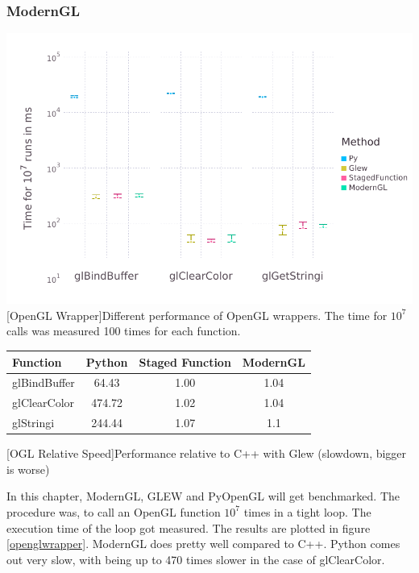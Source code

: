\subsubsection{ModernGL}
\vspace{1em}
\begin{minipage}{\linewidth}
    \centering
    \includegraphics[width=0.9\linewidth]{graphics/glbench.pdf}
    [OpenGL Wrapper]{Different performance of OpenGL wrappers. The time for $10^7$ calls was measured 100 times for each function.}
    \label{fig:openglwrapper}
\end{minipage}
\begin{table}[htbp]
    \centering
    \begin{tabular}{l|c|c|c}
        \hline
        \textbf{Function}   & \textbf{Python}    & \textbf{Staged Function} & \textbf{ModernGL} \\
        \hline
        glBindBuffer        & 64.43              & 1.00 & 1.04 \\
        glClearColor        & 474.72             & 1.02 & 1.04 \\
        glStringi           & 244.44             & 1.07 & 1.1  \\
    \end{tabular}
    [OGL Relative Speed]{Performance relative to C++ with Glew (slowdown, bigger is worse)}
    \label{table:relativespeedoglw}
\end{table}

In this chapter, ModernGL, GLEW and PyOpenGL will get benchmarked.
The procedure was, to call an OpenGL function $10^7$ times in a tight loop. The execution time of the loop got measured.
The results are plotted in figure \cref{openglwrapper}.
ModernGL does pretty well compared to C++. Python comes out very slow, with being up to 470 times slower in the case of glClearColor.

